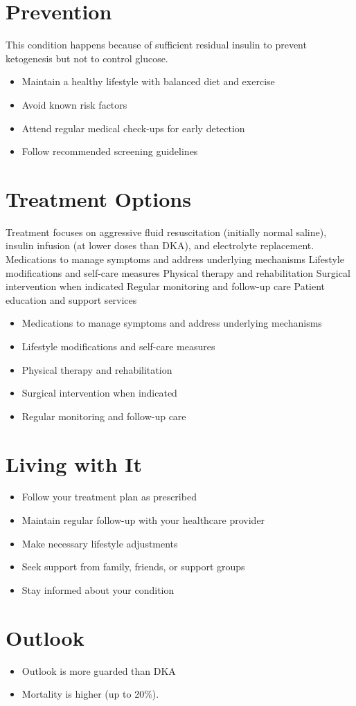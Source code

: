 \section{Prevention}
This condition happens because of sufficient residual insulin to prevent ketogenesis but not to control glucose.

\begin{itemize}[noitemsep]
  \item Maintain a healthy lifestyle with balanced diet and exercise
  \item Avoid known risk factors
  \item Attend regular medical check-ups for early detection
  \item Follow recommended screening guidelines
\end{itemize}
\section{Treatment Options}
Treatment focuses on aggressive fluid resuscitation (initially normal saline), insulin infusion (at lower doses than DKA), and electrolyte replacement. Medications to manage symptoms and address underlying mechanisms Lifestyle modifications and self-care measures Physical therapy and rehabilitation Surgical intervention when indicated Regular monitoring and follow-up care Patient education and support services

\begin{itemize}[noitemsep]
  \item Medications to manage symptoms and address underlying mechanisms
  \item Lifestyle modifications and self-care measures
  \item Physical therapy and rehabilitation
  \item Surgical intervention when indicated
  \item Regular monitoring and follow-up care
\end{itemize}
\section{Living with It}
\begin{itemize}[noitemsep]
  \item Follow your treatment plan as prescribed
  \item Maintain regular follow-up with your healthcare provider
  \item Make necessary lifestyle adjustments
  \item Seek support from family, friends, or support groups
  \item Stay informed about your condition
\end{itemize}
\section{Outlook}
\begin{itemize}[noitemsep]
  \item Outlook is more guarded than DKA
  \item Mortality is higher (up to 20\%).
\end{itemize}
